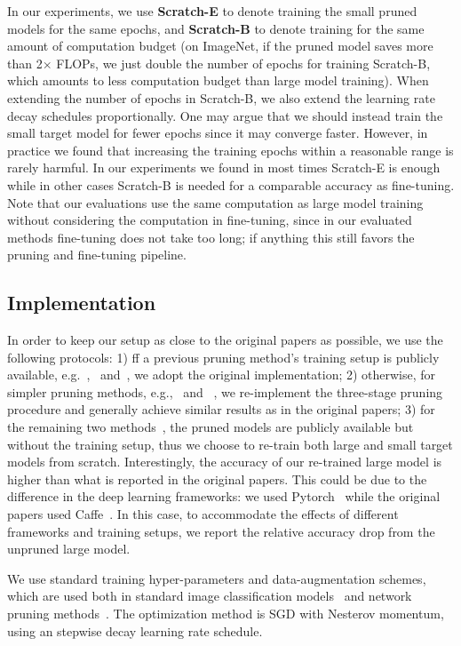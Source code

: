 In our experiments, we use \textbf{Scratch-E} to denote training the small pruned models for the same epochs, and \textbf{Scratch-B} to denote training for the same amount of computation budget (on ImageNet, if the pruned model saves more than 2$\times$ FLOPs, we just double the number of epochs for training Scratch-B, which amounts to less computation budget than large model training). When extending the number of epochs in Scratch-B, we also extend the learning rate decay schedules proportionally. One may argue that we should instead train the small target model for fewer epochs since it may converge faster. However, in practice we found that increasing the training epochs within a reasonable range is rarely harmful. In our experiments we found in most times Scratch-E is enough while in other cases Scratch-B is needed for a comparable accuracy as fine-tuning. Note that our evaluations use the same computation as large model training without considering the computation in fine-tuning, since in our evaluated methods fine-tuning does not take too long; if anything this still favors the pruning and fine-tuning pipeline.

\subsection{Implementation}
In order to keep our setup as close to the original papers as possible, we use the following protocols: 1) ff a previous pruning method's training setup is publicly available, e.g.~\cite{liu2017learning},~\cite{huang2018data} and~\cite{he2018sfp}, we adopt the original implementation; 2) otherwise, for simpler pruning methods, e.g.,~\cite{li2016pruning} and ~\cite{han2015learning}, we re-implement the three-stage pruning procedure and generally achieve similar results as in the original papers; 3) for the remaining two methods~\cite{luo2017thinet, he2017channel}, the pruned models are publicly available but without the training setup, thus we choose to re-train both large and small target models from scratch. Interestingly, the accuracy of our re-trained large model is higher than what is reported in the original papers. This could be due to the difference in the deep learning frameworks: we used Pytorch~\cite{pytorch} while the original papers used Caffe~\cite{caffe}. In this case, to accommodate the effects of different frameworks and training setups, we report the relative accuracy drop from the unpruned large model.

We use standard training hyper-parameters and data-augmentation schemes, which are used both in standard image classification models~\cite{resnet, densenet} and network pruning methods~\cite{li2016pruning, liu2017learning, huang2018data, he2018sfp}. The optimization method is SGD with Nesterov momentum, using an stepwise decay learning rate schedule.

